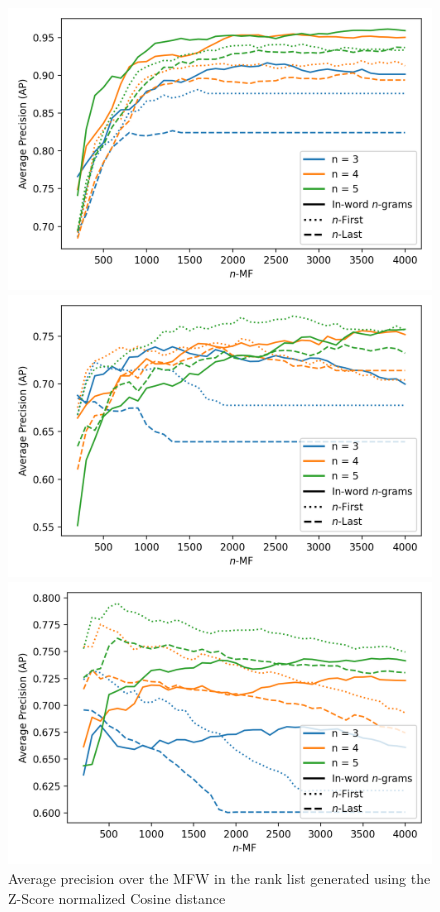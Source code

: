 \begin{figure}
  \centering
  \caption{Average precision over the MFW in the rank list generated using the Z-Score normalized Cosine distance}
  \label{fig:first_last_letters_ngrams}

  \label{fig:first_last_letters_ngrams_oxquarry}
  \includegraphics[width=\linewidth]{img/first_last_letters_ngrams_oxquarry.png}

  \vspace{0.5cm}

  \label{fig:first_last_letters_ngrams_brunet}
  \includegraphics[width=\linewidth]{img/first_last_letters_ngrams_brunet.png}

  \vspace{0.5cm}

  \label{fig:first_last_letters_ngrams_st_jean}
  \includegraphics[width=\linewidth]{img/first_last_letters_ngrams_st_jean.png}
\end{figure}
